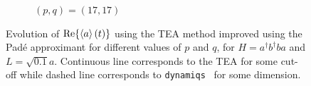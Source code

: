 \begin{figure}[h!]
\begin{subfigure}{0.32\linewidth}
        \caption{$(p, q) = (17, 17)$}
        \label{fig:Pade_17_17}
    \end{subfigure}
    \caption{Evolution of $\Re{\left\langle a \right\rangle(t)}$ using the TEA method improved using the Padé approximant for different values of $p$ and $q$, for  $H = a^\dagger b^\dagger b a$ and $L = \sqrt{0.1} a$. Continuous line corresponds to the TEA for some cut-off while dashed line corresponds to \texttt{dynamiqs}~\cite{dynamiqs} for some dimension.}
    \label{fig:Pade}
\end{figure}